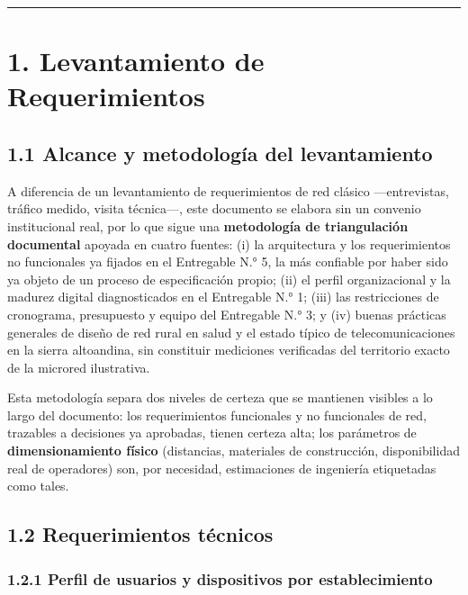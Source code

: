 \documentclass[11pt,a4paper]{article}
\begin{document}
\begin{center}\rule{0.5\linewidth}{0.5pt}\end{center}

\section{1. Levantamiento de Requerimientos}\label{levantamiento-de-requerimientos}

\subsection{1.1 Alcance y metodología del levantamiento}\label{alcance-y-metodologuxeda-del-levantamiento}

A diferencia de un levantamiento de requerimientos de red clásico ---entrevistas, tráfico medido, visita técnica---, este documento se elabora sin un convenio institucional real, por lo que sigue una \textbf{metodología de triangulación documental} apoyada en cuatro fuentes: (i) la arquitectura y los requerimientos no funcionales ya fijados en el Entregable N.° 5, la más confiable por haber sido ya objeto de un proceso de especificación propio; (ii) el perfil organizacional y la madurez digital diagnosticados en el Entregable N.° 1; (iii) las restricciones de cronograma, presupuesto y equipo del Entregable N.° 3; y (iv) buenas prácticas generales de diseño de red rural en salud y el estado típico de telecomunicaciones en la sierra altoandina, sin constituir mediciones verificadas del territorio exacto de la microred ilustrativa.

Esta metodología separa dos niveles de certeza que se mantienen visibles a lo largo del documento: los requerimientos funcionales y no funcionales de red, trazables a decisiones ya aprobadas, tienen certeza alta; los parámetros de \textbf{dimensionamiento físico} (distancias, materiales de construcción, disponibilidad real de operadores) son, por necesidad, estimaciones de ingeniería etiquetadas como tales.

\subsection{1.2 Requerimientos técnicos}\label{requerimientos-tuxe9cnicos}

\subsubsection{1.2.1 Perfil de usuarios y dispositivos por establecimiento}\label{perfil-de-usuarios-y-dispositivos-por-establecimiento}
\end{document}
